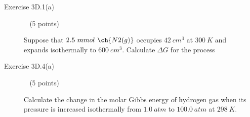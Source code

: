 \documentclass[12pt, openany, letterpaper]{memoir}
\begin{document}
\begin{description}
	\vspace{20em}
	
	\item [Exercise 3D.1(a)] ~ (5 points)
	
	Suppose that $2.5~mmol~\ch{N2(g)}$ occupies $42~cm^3$ at $300~K$ and expands isothermally to $600~cm^3$. Calculate $\Delta G$ for the process
	
	\vspace{12em}
	\item [Exercise 3D.4(a)] ~ (5 points)
	
	Calculate the change in the molar Gibbs energy of hydrogen gas when its pressure is increased isothermally from $1.0~atm$ to $100.0~atm$ at $298~K$.
	

\end{description}
\end{document}
